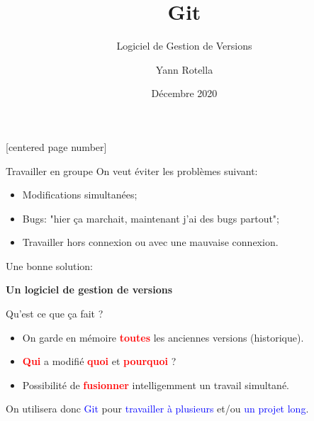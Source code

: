 \documentclass[presentation]{beamer}
\title{Git}
\subtitle{Logiciel de Gestion de Versions}
\author{Yann Rotella}
\institute{IN100, Université de Versailles Saint Quentin en Yvelines}
\date{Décembre 2020}
\begin{document}
\lstset{language=bash}
\begin{frame}[noframenumbering]
\titlepage
\end{frame}
[centered page number]

\begin{frame}{Travailler en groupe}
On veut éviter les problèmes suivant:
\begin{itemize}
	\item Modifications simultanées;
	\item Bugs: "hier \c ca marchait, maintenant j'ai des bugs partout";
	\item Travailler hors connexion ou avec une mauvaise connexion.
\end{itemize}
\pause
Une bonne solution:
\begin{center}
	\textbf{Un logiciel de gestion de versions}
\end{center}
\end{frame}

\begin{frame}{Qu'est ce que \c ca fait ?}
\begin{itemize}
	\item On garde en mémoire \textcolor{red}{\textbf{toutes}} les anciennes versions (historique).
	\item \textcolor{red}{\textbf{Qui}} a modifié \textcolor{red}{\textbf{quoi}} et \textcolor{red}{\textbf{pourquoi}} ?
	\item Possibilité de \textcolor{red}{\textbf{fusionner}} intelligemment un travail simultané.
\end{itemize}
\pause
\hspace{1cm}
\begin{center}
	On utilisera donc \textcolor{blue}{Git} pour \textcolor{blue}{travailler à plusieurs} et/ou \textcolor{blue}{un projet long}.
\end{center}
\end{frame}
\end{document}
